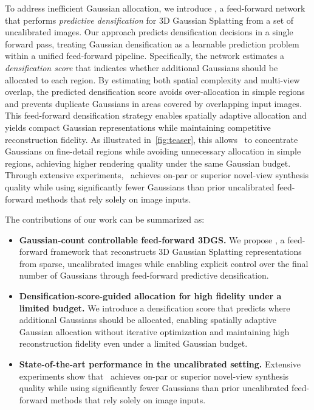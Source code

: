 To address inefficient Gaussian allocation, we introduce \textbf{\OURMODEL}, a feed-forward network that performs \emph{predictive densification} for 3D Gaussian Splatting from a set of uncalibrated images.
Our approach predicts densification decisions in a single forward pass, treating Gaussian densification as a learnable prediction problem within a unified feed-forward pipeline.
Specifically, the network estimates a \emph{densification score} that indicates whether additional Gaussians should be allocated to each region.
By estimating both spatial complexity and multi-view overlap, the predicted densification score avoids over-allocation in simple regions and prevents duplicate Gaussians in areas covered by overlapping input images.
This feed-forward densification strategy enables spatially adaptive allocation and yields compact Gaussian representations while maintaining competitive reconstruction fidelity. As illustrated in~\cref{fig:teaser}, this allows \OURMODEL\ to concentrate Gaussians on fine-detail regions while avoiding unnecessary allocation in simple regions, achieving higher rendering quality under the same Gaussian budget.
Through extensive experiments, \OURMODEL\ achieves on-par or superior novel-view synthesis quality while using significantly fewer Gaussians than prior uncalibrated feed-forward methods that rely solely on image inputs.

The contributions of our work can be summarized as:
\begin{itemize}
    \item \textbf{Gaussian-count controllable feed-forward 3DGS.} We propose \OURMODEL, a feed-forward framework that reconstructs 3D Gaussian Splatting representations from sparse, uncalibrated images while enabling explicit control over the final number of Gaussians through feed-forward predictive densification.

    \item \textbf{Densification-score-guided allocation for high fidelity under a limited budget.} We introduce a densification score that predicts where additional Gaussians should be allocated, enabling spatially adaptive Gaussian allocation without iterative optimization and maintaining high reconstruction fidelity even under a limited Gaussian budget.

    \item \textbf{State-of-the-art performance in the uncalibrated setting.} Extensive experiments show that \OURMODEL\ achieves on-par or superior novel-view synthesis quality while using significantly fewer Gaussians than prior uncalibrated feed-forward methods that rely solely on image inputs.
\end{itemize}